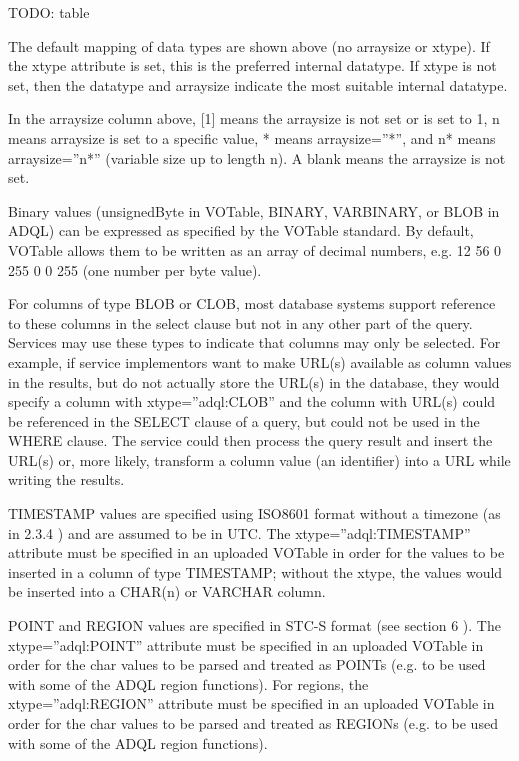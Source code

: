 \documentclass[11pt,a4paper]{ivoa}
\begin{document}
TODO: table

The default mapping of data types are shown above (no arraysize or xtype). If 
the xtype attribute is set, this is the preferred internal datatype. If xtype is 
not set, then the datatype and arraysize indicate the most suitable internal 
datatype.

In the arraysize column above, [1] means the arraysize is not set or is set to 
1, n means arraysize is set to a specific value, * means arraysize=”*”, and n* 
means arraysize=”n*” (variable size up to length n). A blank means the arraysize 
is not set.

Binary values (unsignedByte in VOTable, BINARY, VARBINARY, or BLOB in ADQL) can 
be expressed as specified by the VOTable standard. By default, VOTable allows 
them to be written as an array of decimal numbers, e.g. 12 56 0 255 0 0 255 (one 
number per byte value).

For columns of type BLOB or CLOB, most database systems support reference to 
these columns in the select clause but not in any other part of the query. 
Services may use these types to indicate that columns may only be selected. For 
example, if service implementors want to make URL(s) available as column values 
in the results, but do not actually store the URL(s) in the database, they would 
specify a column with xtype=”adql:CLOB” and the column with URL(s) could be 
referenced in the SELECT clause of a query, but could not be used in the WHERE 
clause. The service could then process the query result and insert the URL(s) 
or, more likely, transform a column value (an identifier) into a URL while 
writing the results.

TIMESTAMP values are specified using ISO8601 format without a timezone (as in 
2.3.4 ) and are assumed to be in UTC. The xtype=”adql:TIMESTAMP” attribute must 
be specified in an uploaded VOTable in order for the values to be inserted in a 
column of type TIMESTAMP; without the xtype, the values would be inserted into a 
CHAR(n) or VARCHAR column.

POINT and REGION values are specified in STC-S format (see section 6 ). The 
xtype=”adql:POINT” attribute must be specified in an uploaded VOTable in order 
for the char values to be parsed and treated as POINTs (e.g. to be used with 
some of the ADQL region functions). For regions, the xtype=”adql:REGION” 
attribute must be specified in an uploaded VOTable in order for the char values 
to be parsed and treated as REGIONs (e.g. to be used with some of the ADQL 
region functions).
\end{document}
